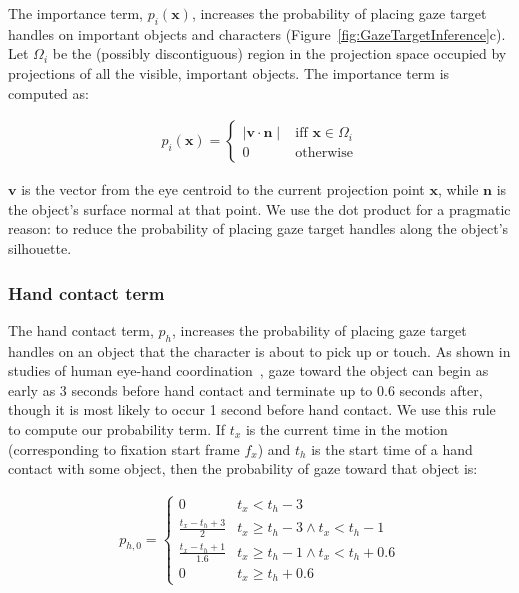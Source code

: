 The importance term, $p_i(\mathbf{x})$, increases the probability of placing gaze target handles on important objects and characters (Figure~\ref{fig:GazeTargetInference}c). Let $\Omega_i$ be the (possibly discontiguous) region in the projection space occupied by projections of all the visible, important objects. The importance term is computed as:

\begin{align} \label{eq:GazeImportanceProbability}
p_i(\mathbf{x}) =
\begin{cases}
\mid \mathbf{v} \cdot \mathbf{n} \mid & \text{iff } \mathbf{x} \in \Omega_i  \\
0 & \text{otherwise}
\end{cases}
\end{align}

$\mathbf{v}$ is the vector from the eye centroid to the current projection point $\mathbf{x}$, while $\mathbf{n}$ is the object's surface normal at that point. We use the dot product for a pragmatic reason: to reduce the probability of placing gaze target handles along the object's silhouette.

\subsubsection{Hand contact term}

The hand contact term, $p_h$, increases the probability of placing gaze target handles on an object that the character is about to pick up or touch. As shown in studies of human eye-hand coordination~\citep{johansson2001eyehead}, gaze toward the object can begin as early as 3 seconds before hand contact and terminate up to 0.6 seconds after, though it is most likely to occur 1 second before hand contact. We use this rule to compute our probability term. If $t_x$ is the current time in the motion (corresponding to fixation start frame $f_x$) and $t_h$ is the start time of a hand contact with some object, then the probability of gaze toward that object is:

\begin{align} \label{eq:GazeHandContactProbabilityTime}
p_{h,0} =
\begin{cases}
0 & t_x < t_h - 3 \\
\frac{t_x - t_h + 3}{2} & t_x \geq t_h - 3 \wedge t_x < t_h - 1 \\
\frac{t_x - t_h + 1}{1.6} & t_x \geq t_h - 1 \wedge t_x < t_h + 0.6 \\
0 & t_x \geq t_h + 0.6
\end{cases}
\end{align}

